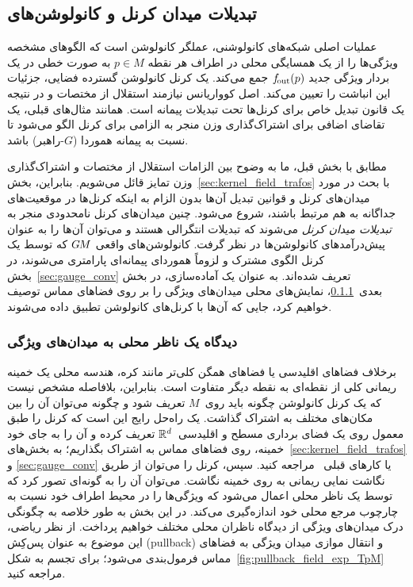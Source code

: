 
\subsection{تبدیلات میدان کرنل و کانولوشن‌های }
\label{sec:gauge_conv_main}


عملیات اصلی شبکه‌های کانولوشنی، عملگر کانولوشن است که الگوهای مشخصه ویژگی‌ها را از یک همسایگی محلی در اطراف هر نقطه $p\in M$ به صورت خطی در یک بردار ویژگی جدید $f_\textup{\:\!\!out}(p)$ جمع می‌کند.
یک کرنل کانولوشن گسترده فضایی، جزئیات این انباشت را تعیین می‌کند.
اصل کوواریانس نیازمند استقلال از مختصات و در نتیجه یک قانون تبدیل خاص برای کرنل‌ها تحت تبدیلات پیمانه است.
همانند مثال‌های قبلی، یک تقاضای اضافی برای اشتراک‌گذاری وزن منجر به الزامی برای کرنل الگو می‌شود تا نسبت به پیمانه هموردا ($G$-راهبر) باشد.

مطابق با بخش قبل، ما به وضوح بین الزامات استقلال از مختصات و اشتراک‌گذاری وزن تمایز قائل می‌شویم.
بنابراین، بخش~\ref{sec:kernel_field_trafos} با بحث در مورد میدان‌های کرنل و قوانین تبدیل آن‌ها بدون الزام به اینکه کرنل‌ها در موقعیت‌های جداگانه به هم مرتبط باشند، شروع می‌شود.
چنین میدان‌های کرنل نامحدودی منجر به \emph{تبدیلات میدان کرنل} می‌شوند که تبدیلات انتگرالی هستند و می‌توان آن‌ها را به عنوان پیش‌درآمدهای کانولوشن‌ها در نظر گرفت.
کانولوشن‌های واقعی $G\mkern-1.4muM$ که توسط یک کرنل الگوی مشترک و لزوماً هموردای پیمانه‌ای پارامتری می‌شوند، در بخش~\ref{sec:gauge_conv} تعریف شده‌اند.
به عنوان یک آماده‌سازی، در بخش بعدی~\ref{sec:observers_view}، نمایش‌های محلی میدان‌های ویژگی را بر روی فضاهای مماس توصیف خواهیم کرد، جایی که آن‌ها با کرنل‌های کانولوشن تطبیق داده می‌شوند.

\subsubsection{دیدگاه یک ناظر محلی به میدان‌های ویژگی}
\label{sec:observers_view}

برخلاف فضاهای اقلیدسی یا فضاهای همگن کلی‌تر مانند کره، هندسه محلی یک خمینه ریمانی کلی از نقطه‌ای به نقطه دیگر متفاوت است.
بنابراین، بلافاصله مشخص نیست که یک کرنل کانولوشن چگونه باید روی~$M$ تعریف شود و چگونه می‌توان آن را بین مکان‌های مختلف به اشتراک گذاشت.
یک راه‌حل رایج این است که کرنل را طبق معمول روی یک فضای برداری مسطح و اقلیدسی~$\mathbb{R}^d$ تعریف کرده و آن را به جای خود خمینه، روی فضاهای مماس به اشتراک بگذاریم؛
به بخش‌های~\ref{sec:kernel_field_trafos} و \ref{sec:gauge_conv} یا کارهای قبلی~%
\cite{masci2015geodesic,poulenard2018multi,sun2018zernet,coors2018spherenet,gaugeIco2019,Wiersma2020,deHaan2020meshCNNs,Yang2020parallelFrameCNN} مراجعه کنید.
سپس، کرنل را می‌توان از طریق نگاشت نمایی ریمانی به روی خمینه نگاشت.
می‌توان آن را به گونه‌ای تصور کرد که توسط یک ناظر محلی اعمال می‌شود که ویژگی‌ها را در محیط اطراف خود نسبت به چارچوب مرجع محلی خود اندازه‌گیری می‌کند.
در این بخش به طور خلاصه به چگونگی درک میدان‌های ویژگی از دیدگاه ناظران محلی مختلف خواهیم پرداخت.
از نظر ریاضی، این موضوع به عنوان پس‌کِش (pullback) و انتقال موازی میدان ویژگی به فضاهای مماس فرمول‌بندی می‌شود؛ برای تجسم به شکل~\ref{fig:pullback_field_exp_TpM} مراجعه کنید.

